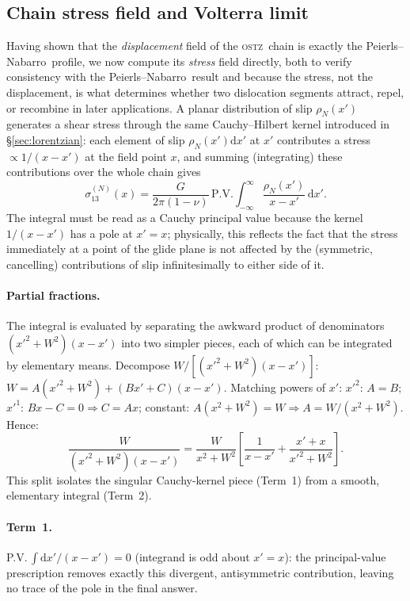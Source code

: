 \documentclass[5p,sort&compress]{elsarticle}
\newcommand{\OSTZ}{\textsc{ostz}}
\newcommand{\PN}{Peierls--Nabarro}
\begin{document}
\subsection{Chain stress field and Volterra limit}
\label{sec:chainStress}

Having shown that the \emph{displacement} field of the \OSTZ\ chain
is exactly the \PN\ profile, we now compute its \emph{stress} field
directly, both to verify consistency with the \PN\ result and
because the stress, not the displacement, is what determines whether
two dislocation segments attract, repel, or recombine in later
applications. A planar distribution of slip $\rho_N(x')$ generates a
shear stress through the same Cauchy--Hilbert kernel introduced in
\S\ref{sec:lorentzian}: each element of slip $\rho_N(x')\mathrm dx'$
at $x'$ contributes a stress $\propto1/(x-x')$ at the field point
$x$, and summing (integrating) these contributions over the whole
chain gives
\begin{equation}
  \sigma_{13}^{(N)}(x)=\frac{G}{2\pi(1-\nu)}\,\mathrm{P.V.}
  \int_{-\infty}^\infty\frac{\rho_N(x')}{x-x'}\,\mathrm dx'.
  \label{eq:conv}
\end{equation}
The integral must be read as a Cauchy principal value because the
kernel $1/(x-x')$ has a pole at $x'=x$; physically, this reflects the
fact that the stress immediately at a point of the glide plane is
not affected by the (symmetric, cancelling) contributions of slip
infinitesimally to either side of it.

\paragraph{Partial fractions.}
The integral is evaluated by separating the awkward product of
denominators $(x'^2+W^2)(x-x')$ into two simpler pieces, each of
which can be integrated by elementary means. Decompose
$W/[(x'^2+W^2)(x-x')]$:
$W=A(x'^2+W^2)+(Bx'+C)(x-x')$.
Matching powers of $x'$:
$x'^2$: $A=B$;
$x'^1$: $Bx-C=0\Rightarrow C=Ax$;
constant: $A(x^2+W^2)=W\Rightarrow A=W/(x^2+W^2)$.
Hence:
\[
  \frac{W}{(x'^2+W^2)(x-x')}
  =\frac{W}{x^2+W^2}\!\left[\frac{1}{x-x'}
  +\frac{x'+x}{x'^2+W^2}\right].
\]
This split isolates the singular Cauchy-kernel piece (Term~1) from a
smooth, elementary integral (Term~2).

\paragraph{Term~1.}
P.V.\,$\int\mathrm dx'/(x-x')=0$ (integrand is odd about $x'=x$): the
principal-value prescription removes exactly this divergent,
antisymmetric contribution, leaving no trace of the pole in the
final answer.
\end{document}

